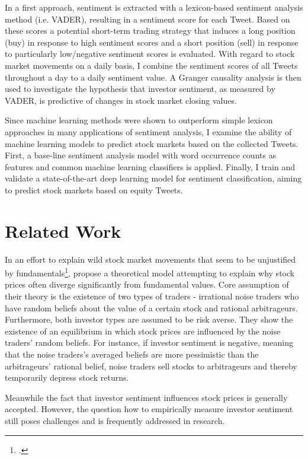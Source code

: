 \documentclass[a4paper,12pt]{article}%
\begin{document}
In a first approach, sentiment is extracted with a lexicon-based sentiment analysis method (i.e. VADER), resulting in a sentiment score for each Tweet. Based on these scores a potential short-term trading strategy that induces a long position (buy) in response to high sentiment scores and a short position (sell) in response to particularly low/negative sentiment scores is evaluated. With regard to stock market movements on a daily basis, I combine the sentiment scores of all Tweets throughout a day to a daily sentiment value. A Granger causality analysis is then used to investigate the hypothesis that investor sentiment, as measured by VADER, is predictive of changes in stock market closing values.

Since machine learning methods were shown to outperform simple lexicon approaches in many applications of sentiment analysis, I examine the ability of machine learning models to predict stock markets based on the collected Tweets. First, a base-line sentiment analysis model with word occurrence counts as features and common machine learning classifiers is applied. Finally, I train and validate a state-of-the-art deep learning model for sentiment classification, aiming to predict stock markets based on equity Tweets.

\section{Related Work}
In an effort to explain wild stock market movements that seem to be unjustified by fundamentals\footcite{Tetlock2007}, \citet{DeLong1990} propose a theoretical model attempting to explain why stock prices often diverge significantly from fundamental values. Core assumption of their theory is the existence of two types of traders - irrational noise traders who have random beliefs about the value of a certain stock and rational arbitrageurs. Furthermore, both investor types are assumed to be risk averse. They show the existence of an equilibrium in which stock prices are influenced by the noise traders' random beliefs. For instance, if investor sentiment is negative, meaning that the noise traders's averaged beliefs are more pessimistic than the arbitrageurs' rational belief, noise traders sell stocks to arbitrageurs and thereby temporarily depress stock returns.

Meanwhile the fact that investor sentiment influences stock prices is generally accepted. However, the question how to empirically measure investor sentiment still poses challenges and is frequently addressed in research.
\end{document}
